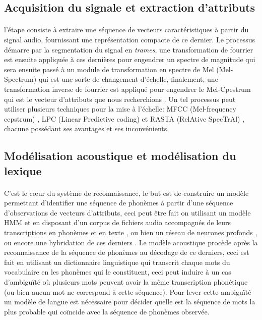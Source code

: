 	\subsection{Acquisition du signale et extraction d'attributs}
		\paragraph{}
		l'étape consiste à extraire une séquence de vecteurs caractéristiques à partir du signal audio, fournissant une représentation compacte de ce dernier. Le processus démarre par la segmentation du signal en \textit{trames}, une transformation de fourrier est ensuite appliquée à ces dernières pour engendrer un spectre de magnitude qui sera ensuite passé à un module de transformation en spectre de Mel (Mel-Spectrum) qui est une sorte de changement d'échelle, finalement, une transformation inverse de fourrier est appliqué pour engendrer le Mel-Cpestrum qui est le vecteur d'attributs que nous recherchions \cite{asr_extraction}. Un tel processus peut utiliser plusieurs techniques pour la mise à l'échelle: MFCC (Mel-frequency cepstrum) \cite{MFCC}, LPC (Linear Predictive coding) \cite{LSP} et RASTA (RelAtive SpecTrAl) \cite{RASTA}, chacune possédant ses avantages et ses inconvénients.
	\subsection{Modélisation acoustique et modélisation du lexique}
		\paragraph{}
		C'est le cœur du système de reconnaissance, le but est de construire un modèle permettant d'identifier une séquence de phonèmes à partir d'une séquence d'observations de vecteurs d'attributs, ceci peut être fait on utilisant un modèle HMM et en disposant d'un corpus de fichiers audio accompagnés de leurs transcriptions en phonèmes et en texte \cite{hmm_acoustic_model,hmm_formal}, ou bien un réseau de neurones profonds \cite{speech_reco_Yu2015}, ou encore une hybridation de ces derniers \cite{dnn-hmm_acoustic_model}. Le modèle acoustique procède après la reconnaissance de la séquence de phonèmes au décodage de ce derniers, ceci est fait en utilisant un dictionnaire linguistique qui transcrit chaque mots du vocabulaire en les phonèmes qui le constituent, ceci peut induire à un cas d'ambiguïté où plusieurs mots peuvent avoir la même transcription phonétique (ou bien aucun mot ne correspond à cette séquence). Pour lever cette ambiguïté un modèle de langue est nécessaire pour décider quelle est la séquence de mots la plus probable qui coïncide avec la séquence de phonèmes observée.  
